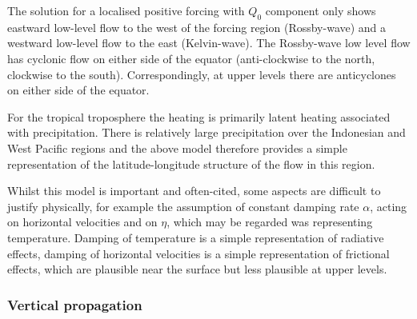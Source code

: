 \documentclass{jknotes}
\begin{document}
The solution for a localised positive forcing with $Q_0$ component only shows
eastward low-level flow to the west of the forcing region (Rossby-wave) and a
westward low-level flow to the east (Kelvin-wave). The Rossby-wave low level
flow has cyclonic flow on either side of the equator (anti-clockwise to the
north, clockwise to the south). Correspondingly, at upper levels there are
anticyclones on either side of the equator.

For the tropical troposphere the heating is primarily latent heating
associated with precipitation. There is relatively large precipitation over
the Indonesian and West Pacific regions and the above model therefore provides
a simple representation of the latitude-longitude structure of the flow in
this region.

Whilst this model is important and often-cited, some aspects are difficult to
justify physically, for example the assumption of constant damping rate
$\alpha$, acting on horizontal velocities and on $\eta$, which may be regarded
was representing temperature. Damping of temperature is a simple
representation of radiative effects, damping of horizontal velocities is a
simple representation of frictional effects, which are plausible near the
surface but less plausible at upper levels.

\subsubsection{Vertical propagation}
\end{document}
